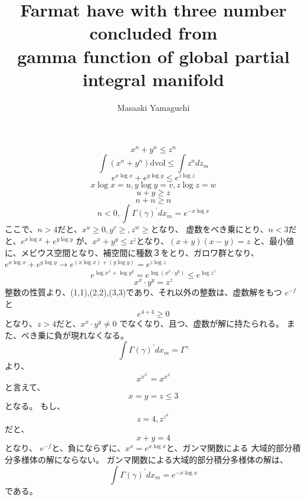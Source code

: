 \documentclass{jsarticle}
\begin{document}
\title{Farmat have with three number concluded from \\
gamma function of global partial integral manifold}
\author{Masaaki Yamaguchi}
\date{}
\maketitle

  $$ x^n + y^n \le z^n $$
  $$ \int (x^n + y^n)\mathrm{dvol} \le \int z^n dz_m $$
  $$ e^{x \log x} + e^{y \log y} \le e^{z \log z} $$
  $$ x \log x = u, y \log y = v, z \log z=w $$
  $$ u + y \ge z $$
  $$ n + n \ge n $$
  $$ n < 0, \int \Gamma(\gamma)^{'}dx_m = e^{- x \log x} $$
  ここで、$ n > 4 $だと、$ x^{u} \ge 0, y^{v} \ge, z^{w} \ge $となり、
  虚数をべき乗にとり、$ n < 3 $だと、$ e^{x \log x} + e^{y \log y} $
  が、$ x^x + y^y \le z^z $となり、$ (x + y)(x - y) = z $
  と、最小値に、メビウス空間となり、補空間に種数３をとり、ガロワ群となり、
  $ e^{x \log x} + e^{y \log y} \to e^{(x\log x)+(y \log y)} = e^{z \log z} $
  $$ e^{\log x^x + \log y^y} = e^{\log (x^x\cdot y^y)} \le e^{\log z^z} $$ 
  $$ x^x \cdot y^y = z^z $$
  整数の性質より、(1,1),(2,2),(3,3)であり、それ以外の整数は、虚数解をもつ
  $ e^{-f} $と　
  $$ e^{4+4}\ge 0 $$
  となり、$ z > 4 $だと、$x^x \cdot y^y \neq 0 $
  でなくなり、且つ、虚数が解に持たられる。
  また、べき乗に負が現れなくなる。
  $$ \int \Gamma(\gamma)^{'}dx_m = \Gamma^{\gamma} $$
  より、
  $$ x^{x^{{3}^{'}}} = x^{x^2} $$
  と言えて、
  $$ x=y=z \le 3 $$
  となる。
  もし、$$ z=4, z^{z^{{4}^{'}}} $$
  だと、
  $$ x + y = 4 $$
  となり、
  $ e^{-f} $と、負にならずに、$ x^x = e^{x \log x} $と、ガンマ関数による
  大域的部分積分多様体の解にならない。
  ガンマ関数による大域的部分積分多様体の解は、
  $$ \int \Gamma(\gamma)^{'}dx_m = e^{-x \log x} $$
  である。
\end{document}
